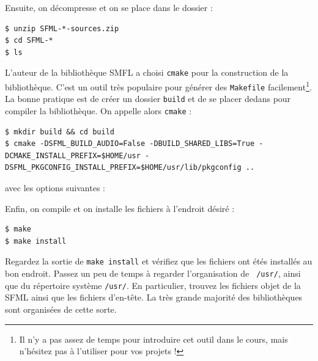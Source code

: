 \documentclass{book}
\begin{document}
Ensuite, on décompresse et on se place dans le dossier :
\begin{verbatim}
$ unzip SFML-*-sources.zip
$ cd SFML-*
$ ls
\end{verbatim}

L'auteur de la bibliothèque SMFL a choisi \texttt{cmake} pour la construction de la bibliothèque. C'est un outil très populaire pour générer des \texttt{Makefile} facilement\footnote{Il n'y a pas assez de temps pour introduire cet outil dans le cours, mais n'hésitez pas à l'utiliser pour vos projets !}. La bonne pratique est de créer un dossier \texttt{build} et de se placer dedans pour compiler la bibliothèque. On appelle alors \texttt{cmake} :

\begin{verbatim}
$ mkdir build && cd build
$ cmake -DSFML_BUILD_AUDIO=False -DBUILD_SHARED_LIBS=True -DCMAKE_INSTALL_PREFIX=$HOME/usr -DSFML_PKGCONFIG_INSTALL_PREFIX=$HOME/usr/lib/pkgconfig ..
\end{verbatim}
avec les options suivantes :

\vspace{1em}
Enfin, on compile et on installe les fichiers à l'endroit désiré :

\begin{verbatim}
$ make
$ make install
\end{verbatim}

Regardez la sortie de \texttt{make install} et vérifiez que les fichiers ont étés installés au bon endroit. Passez un peu de temps à regarder l'organisation de \texttt{~/usr/}, ainsi que du répertoire système \texttt{/usr/}. En particulier, trouvez les fichiers objet de la SFML ainsi que les fichiers d'en-tête. La très grande majorité des bibliothèques sont organisées de cette sorte.
\end{document}
